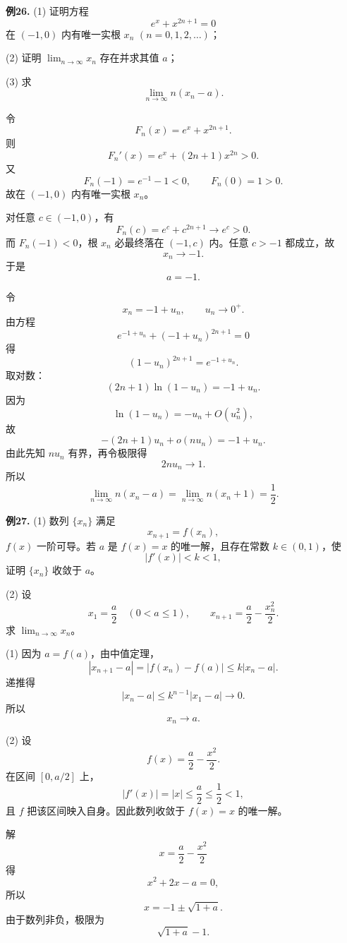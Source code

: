 \begin{problemblock}
\textbf{例26.} (1) 证明方程
\[
e^x+x^{2n+1}=0
\]
在 \((-1,0)\) 内有唯一实根 \(x_n\) \((n=0,1,2,\dots)\)；

(2) 证明 \(\displaystyle\lim_{n\to\infty}x_n\) 存在并求其值 \(a\)；

(3) 求
\[
\lim_{n\to\infty}n(x_n-a).
\]
\end{problemblock}

\begin{solutionblock}

令
\[
F_n(x)=e^x+x^{2n+1}.
\]
则
\[
F_n' (x)=e^x+(2n+1)x^{2n}>0.
\]
又
\[
F_n(-1)=e^{-1}-1<0,\qquad F_n(0)=1>0.
\]
故在 \((-1,0)\) 内有唯一实根 \(x_n\)。

对任意 \(c\in(-1,0)\)，有
\[
F_n(c)=e^c+c^{2n+1}\to e^c>0.
\]
而 \(F_n(-1)<0\)，根 \(x_n\) 必最终落在 \((-1,c)\) 内。任意 \(c>-1\) 都成立，故
\[
x_n\to -1.
\]
于是
\[
a=-1.
\]

令
\[
x_n=-1+u_n,\qquad u_n\to0^+.
\]
由方程
\[
e^{-1+u_n}+(-1+u_n)^{2n+1}=0
\]
得
\[
(1-u_n)^{2n+1}=e^{-1+u_n}.
\]
取对数：
\[
(2n+1)\ln(1-u_n)=-1+u_n.
\]
因为
\[
\ln(1-u_n)=-u_n+O(u_n^2),
\]
故
\[
-(2n+1)u_n+o(nu_n)=-1+u_n.
\]
由此先知 \(nu_n\) 有界，再令极限得
\[
2nu_n\to1.
\]
所以
\[
\lim_{n\to\infty}n(x_n-a)
=\lim_{n\to\infty}n(x_n+1)
=\frac12.
\]

\end{solutionblock}

\begin{problemblock}
\textbf{例27.} (1) 数列 \(\{x_n\}\) 满足
\[
x_{n+1}=f(x_n),
\]
\(f(x)\) 一阶可导。若 \(a\) 是 \(f(x)=x\) 的唯一解，且存在常数 \(k\in(0,1)\)，使
\[
|f'(x)|<k<1,
\]
证明 \(\{x_n\}\) 收敛于 \(a\)。

(2) 设
\[
x_1=\frac a2\quad(0<a\le1),\qquad
x_{n+1}=\frac a2-\frac{x_n^2}{2}.
\]
求 \(\displaystyle\lim_{n\to\infty}x_n\)。
\end{problemblock}

\begin{solutionblock}

(1) 因为 \(a=f(a)\)，由中值定理，
\[
|x_{n+1}-a|
=|f(x_n)-f(a)|
\le k|x_n-a|.
\]
递推得
\[
|x_n-a|\le k^{n-1}|x_1-a|\to0.
\]
所以
\[
x_n\to a.
\]

(2) 设
\[
f(x)=\frac a2-\frac{x^2}{2}.
\]
在区间 \([0,a/2]\) 上，
\[
|f'(x)|=|x|\le\frac a2\le\frac12<1,
\]
且 \(f\) 把该区间映入自身。因此数列收敛于 \(f(x)=x\) 的唯一解。

解
\[
x=\frac a2-\frac{x^2}{2}
\]
得
\[
x^2+2x-a=0,
\]
所以
\[
x=-1\pm\sqrt{1+a}.
\]
由于数列非负，极限为
\[
\sqrt{1+a}-1.
\]

\end{solutionblock}

